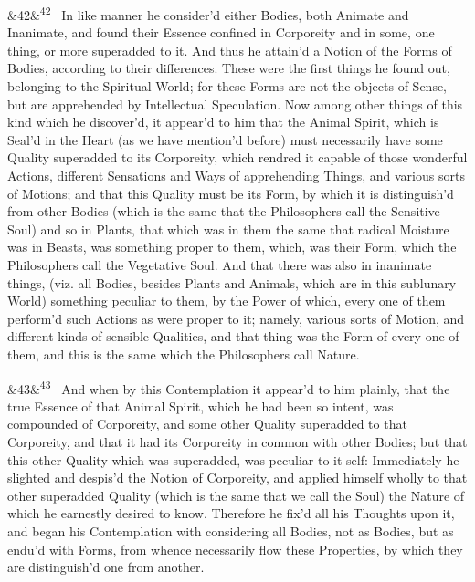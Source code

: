 \documentclass[12pt]{article}
\newcommand{\para}[1][]{\par\noindent\ifx&#1&\else\textsuperscript{\footnotesize #1}~\fi}
\begin{document}
\para[42] In like manner he consider'd either Bodies, both Animate and Inanimate, and found their Essence confined in Corporeity and in some, one thing, or more superadded to it. And thus he attain'd a Notion of the Forms of Bodies, according to their differences. These were the first things he found out, belonging to the Spiritual World; for these Forms are not the objects of Sense, but are apprehended by Intellectual Speculation. Now among other things of this kind which he discover'd, it appear'd to him that the Animal Spirit, which is Seal'd in the Heart (as we have mention'd before) must necessarily have some Quality superadded to its Corporeity, which rendred it capable of those wonderful Actions, different Sensations and Ways of apprehending Things, and various sorts of Motions; and that this Quality must be its Form, by which it is distinguish'd from other Bodies (which is the same that the Philosophers call the Sensitive Soul) and so in Plants, that which was in them the same that radical Moisture was in Beasts, was something proper to them, which, was their Form, which the Philosophers call the Vegetative Soul. And that there was also in inanimate things, (viz. all Bodies, besides Plants and Animals, which are in this sublunary World) something peculiar to them, by the Power of which, every one of them perform'd such Actions as were proper to it; namely, various sorts of Motion, and different kinds of sensible Qualities, and that thing was the Form of every one of them, and this is the same which the Philosophers call Nature.

\para[43] And when by this Contemplation it appear'd to him plainly, that the true Essence of that Animal Spirit, which he had been so intent, was compounded of Corporeity, and some other Quality superadded to that Corporeity, and that it had its Corporeity in common with other Bodies; but that this other Quality which was superadded, was peculiar to it self: Immediately he slighted and despis'd the Notion of Corporeity, and applied himself wholly to that other superadded Quality (which is the same that we call the Soul) the Nature of which he earnestly desired to know. Therefore he fix'd all his Thoughts upon it, and began his Contemplation with considering all Bodies, not as Bodies, but as endu'd with Forms, from whence necessarily flow these Properties, by which they are distinguish'd one from another.
\end{document}
